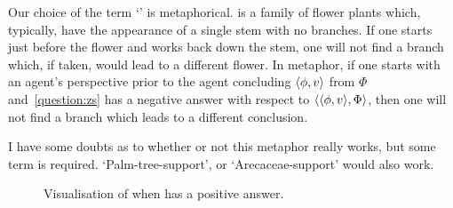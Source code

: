 \begin{note}[Naming]
  Our choice of the term `' is metaphorical.
   is a family of flower plants which, typically, have the appearance of a single stem with no branches.
  If one starts just before the flower and works back down the stem, one will not find a branch which, if taken, would lead to a different flower.
  In metaphor, if one starts with an agent's perspective prior to the agent concluding \(\langle \phi, v \rangle\) from \(\Phi\) and~\autoref{question:zs} has a negative answer with respect to \(\langle \langle \phi, v \rangle, \Phi \rangle\), then one will not find a branch which leads to a different conclusion.

  I have some doubts as to whether or not this metaphor really works, but some term is required.
  `Palm-tree-support', or `Arecaceae-support' would also work.
\end{note}

\begin{figure}[h]
  \centering
    \caption{Visualisation of when \qzS{} has a positive answer.}
    \label{fig:csN:illu:overview}
  \end{figure}

